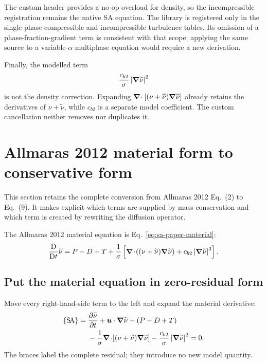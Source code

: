 The custom header provides a no-op overload for
 density, so the incompressible registration remains
the native SA equation.  The library is registered only in the single-phase
compressible and incompressible turbulence tables.  Its omission of a
phase-fraction-gradient term is consistent with that scope; applying the same
source to a variable-\(\alpha\) multiphase equation would require a new
derivation.

Finally, the modelled term
\begin{equation}
  \frac{c_{b2}}{\sigma}
  \left|\boldsymbol{\nabla}\widetilde{\nu}\right|^2
\end{equation}
is not the density correction.  Expanding
\(\boldsymbol{\nabla}\!\cdot[(\nu+\widetilde{\nu})\boldsymbol{\nabla}\widetilde{\nu}]\) already retains the
derivatives of \(\nu+\widetilde{\nu}\), while \(c_{b2}\) is a separate model
coefficient.  The custom cancellation neither removes nor duplicates it.

\clearpage
\section{Allmaras 2012 material form to conservative form}
\label{sec:sa-paper-derivation}

This section retains the complete conversion from Allmaras 2012 Eq.~(2) to
Eq.~(9).  It makes explicit which terms are supplied by mass conservation and
which term is created by rewriting the diffusion operator.

The Allmaras 2012 material equation is Eq.~\eqref{eq:sa-paper-material}:
\begin{equation}
  \frac{\mathrm D}{\mathrm Dt}\widetilde{\nu}
  =P-D+T
  +\frac{1}{\sigma}
   \left[
     \boldsymbol{\nabla}\!\cdot\!\left((\nu+\widetilde{\nu})\boldsymbol{\nabla}\widetilde{\nu}\right)
     +c_{b2}\left|\boldsymbol{\nabla}\widetilde{\nu}\right|^2
   \right].
  \label{eq:sa-deriv-paper-start}
\end{equation}

\subsection{Put the material equation in zero-residual form}

Move every right-hand-side term to the left and expand the material derivative:
\begin{equation}
\begin{aligned}
  \{\mathrm{S\!A}\}={}&
  \frac{\partial\widetilde{\nu}}{\partial t}
  +\boldsymbol u\mathbin{\cdot}\boldsymbol{\nabla}\widetilde{\nu}
  -(P-D+T) \\
  &-\frac{1}{\sigma}
   \boldsymbol{\nabla}\!\cdot\!\left[(\nu+\widetilde{\nu})\boldsymbol{\nabla}\widetilde{\nu}\right]
  -\frac{c_{b2}}{\sigma}
   \left|\boldsymbol{\nabla}\widetilde{\nu}\right|^2
  =0.
\end{aligned}
\label{eq:sa-deriv-sa-residual}
\end{equation}
The braces label the complete residual; they introduce no new model quantity.

